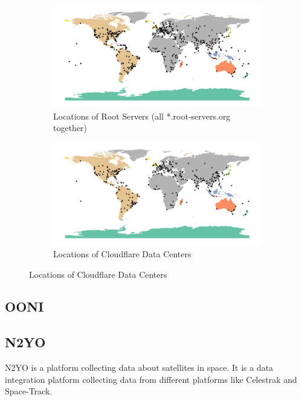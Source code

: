 \begin{figure}
	\begin{subfigure}[t]{0.48\textwidth}
		\includegraphics[width=\textwidth]{./chapters/3-methodology/img/rootserver-locations.png}
		\caption{Locations of Root Servers (all *.root-servers.org
			together) \cite{rootservers092024}}
	\end{subfigure}
	\begin{subfigure}[t]{0.48\textwidth}
		\includegraphics[width=\textwidth]{./chapters/3-methodology/img/cloudflare-datacenter-locations.png}
		\caption{Locations of Cloudflare Data Centers
			\cite{CloudflareGlobalNetwork2024}}
	\end{subfigure}
\end{figure}

\subsection{OONI} \label{sec:ooni}

\subsection{N2YO} \label{sec:n2yo}

N2YO is a platform collecting data about satellites in space. It is a data
integration platform collecting data from different platforms like Celestrak
and Space-Track.

